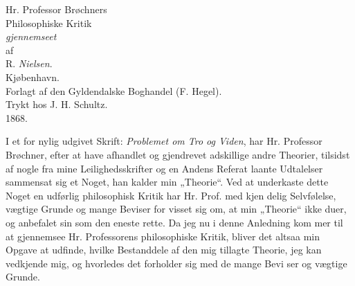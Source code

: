 \documentclass[12pt]{book}
\newcommand{\opage}[1]{\marginnote{\footnotesize\textit{[#1]}}}
\begin{document}
\frontmatter
\begin{titlepage}
\centering
\vspace*{3cm}
{\Large Hr. Professor Brøchners}\\[1em]
{\Huge Philosophiske Kritik}\\[2em]
{\large \emph{gjennemseet}}\\[1.5em]
{\small af}\\[1.5em]
{\large R. \emph{Nielsen}.}\\[5em]
Kjøbenhavn.\\[0.5em]
Forlagt af den Gyldendalske Boghandel (F. Hegel).\\[0.3em]
{\footnotesize Trykt hos J. H. Schultz.}\\[0.5em]
1868.
\end{titlepage}

\mainmatter

\opage{3}\setcounter{footnote}{0}%
I et for nylig udgivet Skrift: \emph{Problemet om
Tro og Viden}, har Hr. Professor Brøchner, efter at
have afhandlet og gjendrevet adskillige andre Theorier,
tilsidst af nogle fra mine Leilighedsskrifter og en Andens
Referat laante Udtalelser sammensat sig et Noget, han
kalder min „Theorie“. Ved at underkaste dette Noget
en udførlig philosophisk Kritik har Hr. Prof. med kjen\-%
delig Selvfølelse, vægtige Grunde og mange Beviser for\-%
visset sig om, at min „Theorie“ ikke duer, og anbefalet sin
som den eneste rette. Da jeg nu i denne Anledning kom\-%
mer til at gjennemsee Hr. Professorens philosophiske
Kritik, bliver det altsaa min Opgave at udfinde, hvilke
Bestanddele af den mig tillagte Theorie, jeg kan vedkjende
mig, og hvorledes det forholder sig med de mange Bevi\-%
ser og vægtige Grunde.
\end{document}
